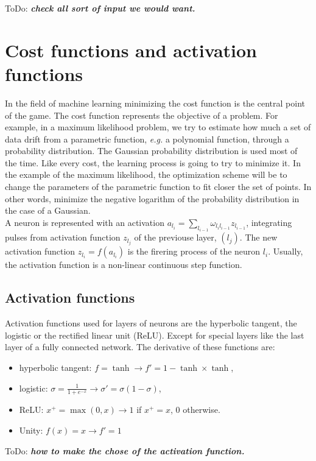 \documentclass[final, paper=letter,5p,times,twocolumn]{elsarticle}
\newcommand{\ToDo}[1]{ToDo: \textbf{\textit{#1}}}
\begin{document}
\ToDo{check all sort of input we would want.} \\

\section{Cost functions and activation functions}

In the field of machine learning minimizing the cost function is the central point of the game. The cost function represents the objective of a problem. For example, in a maximum likelihood problem, we try to estimate how much a set of data drift from a parametric function, {\it e.g.} a polynomial function, through a probability distribution. The Gaussian probability distribution is used most of the time. Like every cost, the learning process is going to try to minimize it. In the example of the maximum likelihood, the optimization scheme will be to change the parameters of the parametric function to fit closer the set of points. In other words, minimize the negative logarithm of the probability distribution in the case of a Gaussian. \\
A neuron is represented with an activation $a_{l_{i}} = \sum_{l_{i-1}}\omega_{l_{i}l_{i-1}} z_{l_{i-1}}$, integrating pulses from activation function $z_{l_{j}}$ of the previouse layer, $(l_{j})$. The new activation function $z_{l_{i}} = f(a_{l_{i}})$ is the firering process of the neuron $l_{i}$. Usually, the activation function is a non-linear continuous step function. 

\subsection{Activation functions}

Activation functions used for layers of neurons are the hyperbolic tangent, the logistic or the rectified linear unit (ReLU). Except for special layers like the last layer of a fully connected network. The derivative of these functions are:

\begin{itemize}
\item hyperbolic tangent: $f = \tanh \rightarrow f' = 1 - \tanh \times \tanh$,
\item logistic: $\sigma = \frac{1}{1+e^{-x}} \rightarrow \sigma' = \sigma (1 - \sigma)$,
\item ReLU: $x^{+} = \max(0,x) \rightarrow 1$ if $x^{+} = x$, 0 otherwise.
\item Unity: $f(x) = x \rightarrow f' = 1$
\end{itemize}
\ToDo{how to make the chose of the activation function.}
\end{document}
